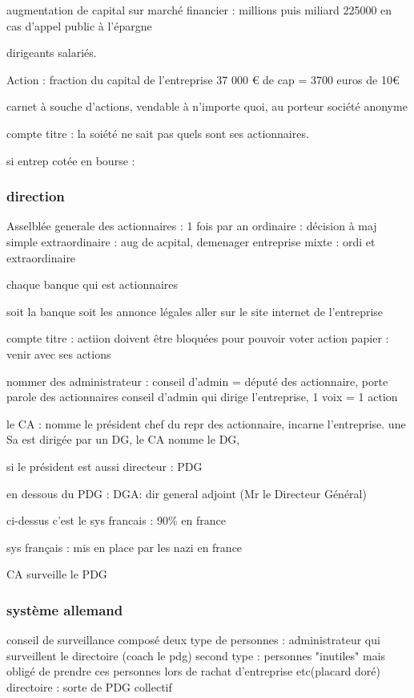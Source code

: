\documentclass[a4paper,12pt]{article}
\begin{document}
augmentation de capital sur marché financier : millions puis miliard
225000 en cas d'appel public à l'épargne

dirigeants salariés.

Action : fraction du capital de l'entreprise 37 000 € de cap = 3700 euros de 10€

carnet à souche d'actions, vendable à n'importe quoi, au porteur
société anonyme

compte titre : la soiété ne sait pas quels sont ses actionnaires.

si entrep cotée en bourse : 


\subsubsection{direction}

Asselblée generale des actionnaires : 1 fois par an
ordinaire : décision à maj simple
extraordinaire : aug de acpital, demenager entreprise
mixte : ordi et extraordinaire

chaque banque qui est actionnaires

soit la banque
soit les annonce légales
aller sur le site internet de l'entreprise

compte titre : actiion doivent être bloquées pour pouvoir voter
action papier : venir avec ses actions


nommer des administrateur : conseil d'admin  = député des actionnaire, porte parole des actionnaires
conseil d'admin qui dirige l'entreprise, 1 voix = 1 action

le CA : nomme le président chef du repr des actionnaire, incarne l'entreprise.
une Sa est dirigée par un DG, le CA nomme le DG, 

si le président est aussi directeur : PDG


en dessous du PDG : DGA: dir general adjoint (Mr le Directeur Général)

ci-dessus c'est le sys francais : 90\% en france

sys français : mis en place par les nazi en france

CA surveille le PDG
\subsubsection{système allemand}

conseil de surveillance composé deux type de personnes : administrateur qui surveillent le directoire (coach le pdg)
second type : personnes "inutiles" mais obligé de prendre ces personnes lors de rachat d'entreprise etc(placard doré)
directoire : sorte de PDG collectif
\end{document}
